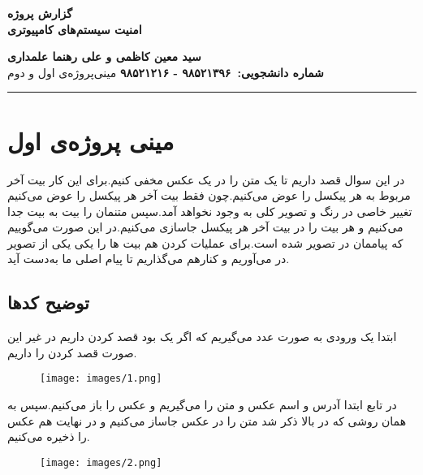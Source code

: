 
\def \Subject {گزارش پروژه}
\def \Course {امنیت سیستم‌های کامپیوتری}
\def \Author {سید معین کاظمی و علی رهنما علمداری}
\def \Report {مینی‌پروژه‌ی اول و دوم}
\def \StudentNumber {۹۸۵۲۱۳۹۶ - ۹۸۵۲۱۲۱۶}

\begin{center}
\vspace{.4cm}
{\bf {\huge \Subject}}\\
{\bf \Large \Course}
\vspace{.2cm}
\end{center}
{\bf \Author }  \\
{\bf شماره دانشجویی:\ \StudentNumber}
\hspace{\fill} 
{\Large \Report} \\
\hrule
\vspace{0.8cm}

\clearpage

\section{مینی پروژه‌ی اول}
در این سوال قصد داریم تا یک متن را در یک عکس مخفی کنیم.برای این کار بیت آخر مربوط به هر پیکسل را عوض می‌کنیم.چون فقط بیت آخر هر پیکسل را عوض می‌کنیم تغییر خاصی در رنگ و تصویر کلی به وجود نخواهد آمد.سپس متنمان را بیت به بیت جدا می‌کنیم و هر بیت را در بیت آخر هر پیکسل جاسازی می‌کنیم.در این صورت می‌گوییم که پیاممان در تصویر 
شده است.برای عملیات
کردن هم بیت ها را یکی یکی از تصویر در می‌آوریم و کنار‌هم می‌گذاریم تا پیام اصلی ما به‌دست آید.

\subsection{توضیح کد‌ها}
\par
ابتدا یک ورودی به صورت عدد می‌گیریم که اگر یک بود قصد
کردن داریم در غیر این صورت قصد
کردن را داریم.
\begin{figure}[h!]
    \centering
    \texttt{[image: images/1.png]}
\end{figure}

در تابع
ابتدا آدرس و اسم عکس و متن را می‌گیریم و عکس را باز می‌کنیم.سپس به همان روشی که در بالا ذکر شد متن را در عکس جاساز می‌کنیم و در نهایت هم عکس را ذخیره می‌کنیم.
\begin{figure}[h!]
    \centering
    \texttt{[image: images/2.png]}
\end{figure}


